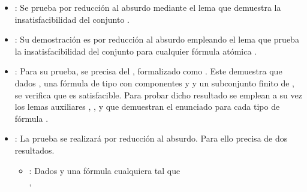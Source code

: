 \begin{isabellebody}
\begin{isamarkuptext}
  \begin{itemize}
    \item {}: Se prueba por reducción al absurdo mediante el lema  que
    demuestra la insatisfacibilidad del conjunto \isa{{\isacharbraceleft}{\isasymbottom}{\isacharbraceright}}.
    \item {}: Su demostración es por reducción al absurdo empleando el lema
     que prueba la insatisfacibilidad del conjunto  para cualquier fórmula
    atómica .
    \item {}: Para su prueba, se precisa del , formalizado como 
    . Este demuestra que dados ,  una fórmula de tipo 
    \isa{{\isasymalpha}} con componentes  y  y  un subconjunto finito de , se verifica que 
     es satisfacible. Para probar dicho resultado se emplean a su vez los lemas
    auxiliares , ,  y 
     que demuestran el enunciado para cada tipo de fórmula \isa{{\isasymalpha}}.
    \item {}: La prueba se realizará por reducción al absurdo. Para ello
    precisa de dos resultados.
    \begin{itemize}
      \item {}: Dados  y  una fórmula cualquiera tal que\\ , 

\end{itemize}
\end{itemize}
\end{isamarkuptext}
\end{isabellebody}
